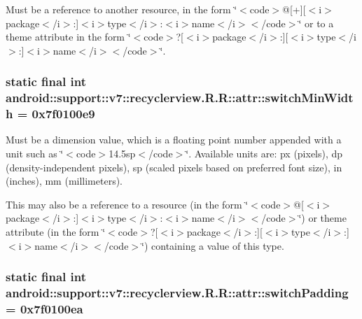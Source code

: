 Must be a reference to another resource, in the form \char`\"{}$<$code$>$@\mbox{[}+\mbox{]}\mbox{[}$<$i$>$package$<$/i$>$:\mbox{]}$<$i$>$type$<$/i$>$:$<$i$>$name$<$/i$>$$<$/code$>$\char`\"{} or to a theme attribute in the form \char`\"{}$<$code$>$?\mbox{[}$<$i$>$package$<$/i$>$:\mbox{]}\mbox{[}$<$i$>$type$<$/i$>$:\mbox{]}$<$i$>$name$<$/i$>$$<$/code$>$\char`\"{}. \hypertarget{classandroid_1_1support_1_1v7_1_1recyclerview_1_1_r_1_1attr_80983815734c39a194141f2e668daa2e}{
\subsubsection[{switchMinWidth}]{\setlength{\rightskip}{0pt plus 5cm}static final int android::support::v7::recyclerview.R.R::attr::switchMinWidth = 0x7f0100e9}}
\label{classandroid_1_1support_1_1v7_1_1recyclerview_1_1_r_1_1attr_80983815734c39a194141f2e668daa2e}


Must be a dimension value, which is a floating point number appended with a unit such as \char`\"{}$<$code$>$14.5sp$<$/code$>$\char`\"{}. Available units are: px (pixels), dp (density-independent pixels), sp (scaled pixels based on preferred font size), in (inches), mm (millimeters). 

This may also be a reference to a resource (in the form \char`\"{}$<$code$>$@\mbox{[}$<$i$>$package$<$/i$>$:\mbox{]}$<$i$>$type$<$/i$>$:$<$i$>$name$<$/i$>$$<$/code$>$\char`\"{}) or theme attribute (in the form \char`\"{}$<$code$>$?\mbox{[}$<$i$>$package$<$/i$>$:\mbox{]}\mbox{[}$<$i$>$type$<$/i$>$:\mbox{]}$<$i$>$name$<$/i$>$$<$/code$>$\char`\"{}) containing a value of this type. \hypertarget{classandroid_1_1support_1_1v7_1_1recyclerview_1_1_r_1_1attr_23674d73174e3f4fb1a79e292dc82aa1}{
\subsubsection[{switchPadding}]{\setlength{\rightskip}{0pt plus 5cm}static final int android::support::v7::recyclerview.R.R::attr::switchPadding = 0x7f0100ea}}
\label{classandroid_1_1support_1_1v7_1_1recyclerview_1_1_r_1_1attr_23674d73174e3f4fb1a79e292dc82aa1}


